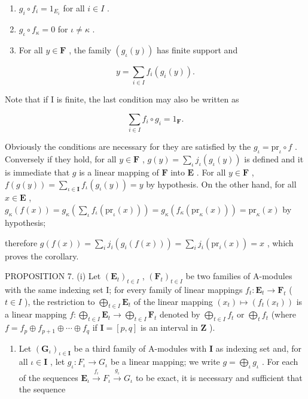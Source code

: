 \begin{enumerate}
\def\labelenumi{(\arabic{enumi})}
\item
  \(g_{i} \circ f_{i} = 1_{E_{i}}\) for all \(i \in I\) .
\item
  \(g_{\iota} \circ f_{\kappa} = 0\) for \(\iota \neq \kappa\) .
\item
  For all \(y \in \mathbf{F}\) , the family \((g_{\iota}(y))\) has finite support and
\end{enumerate}

\[
y = \sum_ {i \in I} f _ {i} (g _ {i} (y)).\tag{23}
\]

Note that if I is finite, the last condition may also be written as

\[
\sum_ {i \in I} f _ {i} \circ g _ {i} = 1 _ {\mathbf {F}}.\tag{24}
\]

Obviously the conditions are necessary for they are satisfied by the \(g_{\iota} = \mathrm{pr}_{\iota} \circ f\) . Conversely if they hold, for all \(y \in \mathbf{F}\) , \(g(y) = \sum_{\iota} j_{\iota}(g_{\iota}(y))\) is defined and it is immediate that \(g\) is a linear mapping of \(\mathbf{F}\) into \(\mathbf{E}\) . For all \(y \in \mathbf{F}\) , \(f(g(y)) = \sum_{\iota \in \mathbf{I}} f_{\iota}(g_{\iota}(y)) = y\) by hypothesis. On the other hand, for all \(x \in \mathbf{E}\) , \(g_{\kappa}(f(x)) = g_{\kappa}\left(\sum_{\iota} f_{\iota}(\mathrm{pr}_{\iota}(x))\right) = g_{\kappa}(f_{\kappa}(\mathrm{pr}_{\kappa}(x))) = \mathrm{pr}_{\kappa}(x)\) by hypothesis;

therefore \(g(f(x)) = \sum_{i} j_i(g_i(f(x))) = \sum_{i} j_i(\mathrm{pr}_i(x)) = x\) , which proves the corollary.

PROPOSITION 7. (i) Let \((\mathbf{E}_t)_{t \in I}\) , \((\mathbf{F}_t)_{t \in I}\) be two families of A-modules with the same indexing set I; for every family of linear mappings \(f_t: \mathbf{E}_t \to \mathbf{F}_t\) ( \(t \in I\) ), the restriction to \(\bigoplus_{t \in I} \mathbf{E}_t\) of the linear mapping \((x_t) \mapsto (f_t(x_t))\) is a linear mapping \(f: \bigoplus_{t \in I} \mathbf{E}_t \to \bigoplus_{t \in I} \mathbf{F}_t\) denoted by \(\bigoplus_{t \in I} f_t\) or \(\bigoplus_{t} f_t\) (where \(f = f_p \oplus f_{p+1} \oplus \cdots \oplus f_q\) if \(\mathbf{I} = [p, q]\) is an interval in \(\mathbf{Z}\) ).

\begin{enumerate}
\def\labelenumi{(\roman{enumi})}
\setcounter{enumi}{1}
\tightlist
\item
  Let \((\mathbf{G}_{\iota})_{\iota \in \mathbf{I}}\) be a third family of A-modules with \(\mathbf{I}\) as indexing set and, for all \(\iota \in \mathbf{I}\) , let \(g_{\iota}: F_{\iota} \to G_{\iota}\) be a linear mapping; we write \(g = \bigoplus_{\iota} g_{\iota}\) . For each of the sequences \(\mathbf{E}_{\iota} \xrightarrow{f_{\iota}} F_{\iota} \xrightarrow{g_{\iota}} G_{\iota}\) to be exact, it is necessary and sufficient that the sequence
\end{enumerate}

